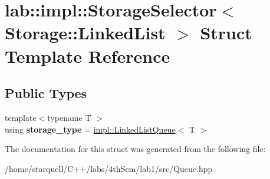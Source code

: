 \hypertarget{structlab_1_1impl_1_1StorageSelector_3_01Storage_1_1LinkedList_01_4}{}\section{lab\+:\+:impl\+:\+:Storage\+Selector$<$ Storage\+:\+:Linked\+List $>$ Struct Template Reference}
\label{structlab_1_1impl_1_1StorageSelector_3_01Storage_1_1LinkedList_01_4}
\subsection*{Public Types}
\begin{DoxyCompactItemize}
\item 
\mbox{\label{structlab_1_1impl_1_1StorageSelector_3_01Storage_1_1LinkedList_01_4_ad2ccdeed322a59cd3bbcba25444972ec}} 
{\footnotesize template$<$typename T $>$ }\\using {\bfseries storage\+\_\+type} = \hyperlink{classlab_1_1impl_1_1LinkedListQueue}{impl\+::\+Linked\+List\+Queue}$<$ T $>$
\end{DoxyCompactItemize}


The documentation for this struct was generated from the following file\+:\begin{DoxyCompactItemize}
\item 
/home/starquell/\+C++/labs/4th\+Sem/lab1/src/Queue.\+hpp\end{DoxyCompactItemize}
